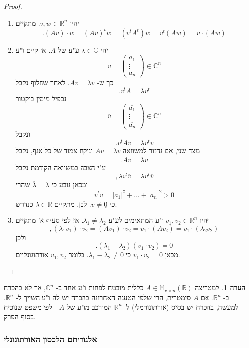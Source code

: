 \documentclass[12pt]{report}
\theoremstyle{plain}
\theoremstyle{definition}
\newtheorem{remark}{הערה}[chapter]
\newcommand{\R}{\mathbb{R}}
\newcommand{\C}{\mathbb{C}}
\newcommand{\M}{\mathbb{M}}
\newcommand{\0}{\mathbf{0}}
\begin{document}
\begin{proof}\
\begin{enumerate}[label=\alph*.]
\item 
יהיו
$v,w\in\R^n$.
מתקיים
$$
.(Av)\cdot w=(Av)^t w=(v^t A^t)w=v^t(Aw)=v\cdot (Aw)
$$


\item 
יהי 
$\lambda\in\C$
ע"ע של 
$A$.
אז קיים ו"ע
$$
v=\begin{pmatrix}a_1\\\vdots\\a_n\end{pmatrix}\in\C^n
$$
כך ש-
$Av=\lambda v$. 
לאחר שחלוף נקבל
$$
.v^tA=\lambda v^t
$$
נכפיל מימין בוקטור
$$
\overline{v}=\begin{pmatrix}\overline{a_1}\\\vdots\\\overline{a_n}\end{pmatrix}\in\C^n
$$
ונקבל
$$
.v^tA\overline{v}=\lambda v^t\overline{v}
$$
מצד שני, אם נחזור למשוואה
$Av=\lambda v$
וניקח צמוד של כל אגף, נקבל
$$
.A\overline{v}=\overline{\lambda}\overline{v}
$$
ע"י הצבה במשוואה הקודמת נקבל
$$
,\overline{\lambda}v^t\overline{v}=\lambda v^t\overline{v}
$$
ומכאן נובע כי
$\overline{\lambda}=\lambda$
שהרי
$$
v^t\overline{v}=|a_1|^2+...+|a_n|^2>0
$$
כי
$v\neq\underline{0}$.
לכן, מתקיים
$\lambda\in\R$
כנדרש.


\item 
יהיו
$v_1,v_2\in\R^n$
ו"ע המתאימים לע"ע 
$\lambda_1\neq\lambda_2$.
אז לפי סעיף א' מתקיים
$$
,(\lambda_1 v_1)\cdot v_2=(Av_1)\cdot v_2=v_1\cdot (Av_2)=v_1\cdot(\lambda_2 v_2)
$$
ולכן
$$
.(\lambda_1-\lambda_2)(v_1\cdot v_2)=0
$$
מכאן
$v_1\cdot v_2=0$
כי
$\lambda_1-\lambda_2\neq 0$.
כלומר 
$v_1,v_2$
אורתוגונליים.


\end{enumerate}
\end{proof}

\begin{remark}
למטריצה
$A\in\M_{n\times n}(\R)$
כללית מובטח לפחות ו"ע אחד ב-
$\C^n$,
אך לא בהכרח ב-
$\R^n$. 
אם 
$A$
סימטרית, הרי שלפי הטענה האחרונה בהכרח יש לה ו"ע השייך ל-
$\R^n$.
למעשה, בהכרח יש בסיס (אורתונורמלי) ל-
$\R^n$
המורכב מו"ע של
$A$
- לפי משפט שנוכיח בסוף הפרק.
\end{remark}

\subsubsection{אלגוריתם הלכסון האורתוגונלי}
\end{document}
